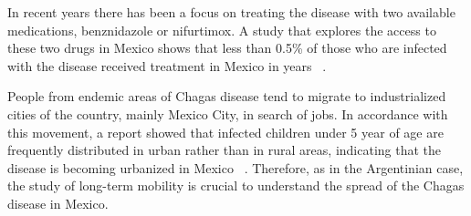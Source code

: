 In recent years there has been a focus on treating the disease with two available
medications, benznidazole or nifurtimox. A study
that explores the access to these two drugs in Mexico
shows that less than 0.5\% of those who are infected with
the disease received treatment in Mexico in years~ \textcite{manne2013barriers}.


People from endemic areas of Chagas disease tend to migrate to industrialized cities of the country, mainly Mexico City, in search of jobs.
In accordance with this movement, a report showed
that infected children under 5 year of age are frequently distributed in urban
rather than in rural areas, indicating that the disease is becoming urbanized in
Mexico~ \textcite{guzman2001epidemiology}.
Therefore, as in the Argentinian case, the study of long-term mobility is crucial to understand the spread of the Chagas disease in Mexico.






